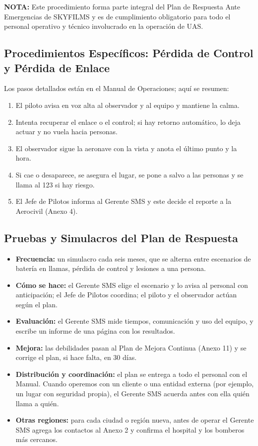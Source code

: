 \textbf{NOTA:} Este procedimiento forma parte integral del Plan de Respuesta Ante Emergencias de SKYFILMS y es de cumplimiento obligatorio para todo el personal operativo y técnico involucrado en la operación de UAS.

\subsection{Procedimientos Específicos: Pérdida de Control y Pérdida de Enlace}
Los pasos detallados están en el Manual de Operaciones; aquí se resumen:
\begin{enumerate}
    \item El piloto avisa en voz alta al observador y al equipo y mantiene la calma.
    \item Intenta recuperar el enlace o el control; si hay retorno automático, lo deja actuar y no vuela hacia personas.
    \item El observador sigue la aeronave con la vista y anota el último punto y la hora.
    \item Si cae o desaparece, se asegura el lugar, se pone a salvo a las personas y se llama al 123 si hay riesgo.
    \item El Jefe de Pilotos informa al Gerente SMS y este decide el reporte a la Aerocivil (Anexo 4).
\end{enumerate}

\subsection{Pruebas y Simulacros del Plan de Respuesta}
\begin{itemize}
    \item \textbf{Frecuencia:} un simulacro cada seis meses, que se alterna entre escenarios de batería en llamas, pérdida de control y lesiones a una persona.
    \item \textbf{Cómo se hace:} el Gerente SMS elige el escenario y lo avisa al personal con anticipación; el Jefe de Pilotos coordina; el piloto y el observador actúan según el plan.
    \item \textbf{Evaluación:} el Gerente SMS mide tiempos, comunicación y uso del equipo, y escribe un informe de una página con los resultados.
    \item \textbf{Mejora:} las debilidades pasan al Plan de Mejora Continua (Anexo 11) y se corrige el plan, si hace falta, en 30 días.
    \item \textbf{Distribución y coordinación:} el plan se entrega a todo el personal con el Manual. Cuando operemos con un cliente o una entidad externa (por ejemplo, un lugar con seguridad propia), el Gerente SMS acuerda antes con ella quién llama a quién.
    \item \textbf{Otras regiones:} para cada ciudad o región nueva, antes de operar el Gerente SMS agrega los contactos al Anexo 2 y confirma el hospital y los bomberos más cercanos.
\end{itemize}

